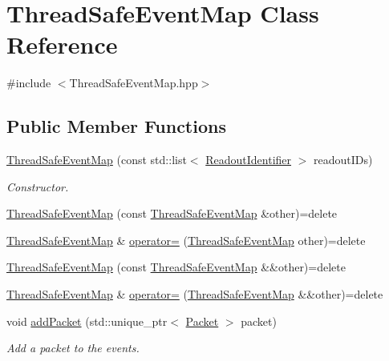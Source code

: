 \hypertarget{class_thread_safe_event_map}{}\section{Thread\+Safe\+Event\+Map Class Reference}
\label{class_thread_safe_event_map}


{\ttfamily \#include $<$Thread\+Safe\+Event\+Map.\+hpp$>$}

\subsection*{Public Member Functions}
\begin{DoxyCompactItemize}
\item 
\hyperlink{class_thread_safe_event_map_a766a347019971b1697e7e223290364b4}{Thread\+Safe\+Event\+Map} (const std\+::list$<$ \hyperlink{class_readout_identifier}{Readout\+Identifier} $>$ readout\+I\+Ds)
\begin{DoxyCompactList}\small\item\em Constructor. \end{DoxyCompactList}\item 
\hyperlink{class_thread_safe_event_map_a523d5bf6c632e3803e721ef3fd94e318}{Thread\+Safe\+Event\+Map} (const \hyperlink{class_thread_safe_event_map}{Thread\+Safe\+Event\+Map} \&other)=delete
\item 
\hyperlink{class_thread_safe_event_map}{Thread\+Safe\+Event\+Map} \& \hyperlink{class_thread_safe_event_map_a1d438208fcc3936dd4384a8a2b55bdf8}{operator=} (\hyperlink{class_thread_safe_event_map}{Thread\+Safe\+Event\+Map} other)=delete
\item 
\hyperlink{class_thread_safe_event_map_af28959f5fbd84f00d227d10e1b37e5e5}{Thread\+Safe\+Event\+Map} (const \hyperlink{class_thread_safe_event_map}{Thread\+Safe\+Event\+Map} \&\&other)=delete
\item 
\hyperlink{class_thread_safe_event_map}{Thread\+Safe\+Event\+Map} \& \hyperlink{class_thread_safe_event_map_a6bf7640fde19d7d6d4dedd5b06c09f84}{operator=} (\hyperlink{class_thread_safe_event_map}{Thread\+Safe\+Event\+Map} \&\&other)=delete
\item 
void \hyperlink{class_thread_safe_event_map_aafd485696f0a50da8afa864f04f0aa07}{add\+Packet} (std\+::unique\+\_\+ptr$<$ \hyperlink{class_packet}{Packet} $>$ packet)
\begin{DoxyCompactList}\small\item\em Add a packet to the events. \end{DoxyCompactList}\item 

\end{DoxyCompactItemize}
